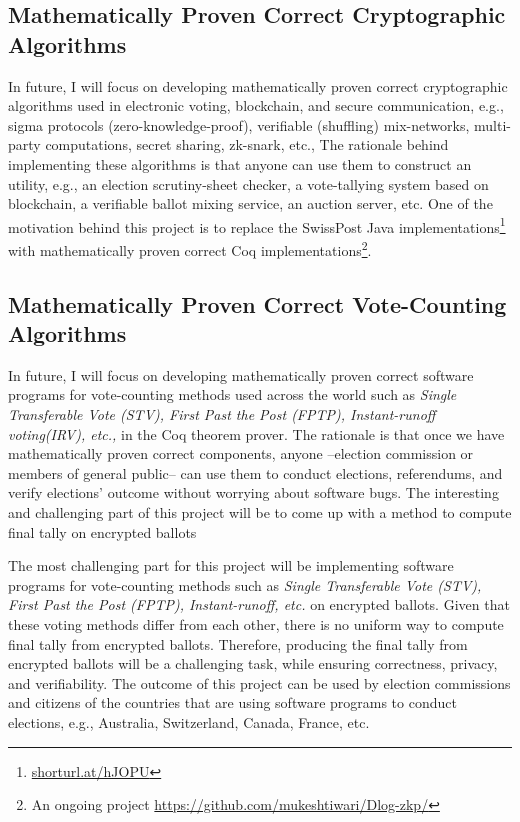 \documentclass[a4paper]{article}
\begin{document}
\subsection{Mathematically Proven Correct Cryptographic Algorithms}
	In future, I will focus on developing mathematically proven correct cryptographic 
	algorithms used in electronic voting, blockchain, and secure communication, e.g., 
  	sigma protocols (zero-knowledge-proof), verifiable (shuffling) mix-networks, 
  	multi-party computations, secret sharing, zk-snark, etc., 
	The rationale behind implementing these algorithms is that anyone can use them to construct 
	an utility, e.g., an election scrutiny-sheet checker, 
	a vote-tallying system based on blockchain,
	a verifiable ballot mixing service, an auction server, etc. One of the motivation
	behind this project is to replace the SwissPost Java implementations\footnote{\url{shorturl.at/hJOPU}} 
	with mathematically proven correct Coq 
	implementations\footnote{An ongoing project \url{https://github.com/mukeshtiwari/Dlog-zkp/}}.
	

	

\subsection{Mathematically Proven Correct Vote-Counting Algorithms}
In future, I will focus on developing mathematically proven correct
software programs for vote-counting methods used across the world
such as \textit{Single Transferable Vote (STV), 
First Past the Post (FPTP), Instant-runoff voting(IRV), etc.,} in the Coq theorem prover. 
The rationale is that once we have  mathematically proven correct 
components, anyone --election commission or members of general public-- can use them 
to conduct elections, referendums, and verify elections' outcome 
without worrying about software bugs. The interesting and challenging part 
of this project will be to come up with a method to compute final 
tally on encrypted ballots 


The most challenging part for 
this project will be implementing software programs  
for vote-counting methods such as \textit{Single Transferable Vote (STV), 
First Past the Post (FPTP), Instant-runoff, etc.} on encrypted ballots. Given that 
these voting methods differ from each other, there is no uniform way to compute 
final tally from encrypted ballots. Therefore, producing the final tally from encrypted 
ballots will be a challenging task, while ensuring correctness, privacy, and 
verifiability. The outcome of this project can be used by election commissions and citizens of 
the countries that are using software programs to conduct elections, e.g.,
Australia, Switzerland, Canada, France, etc. 
\end{document}
